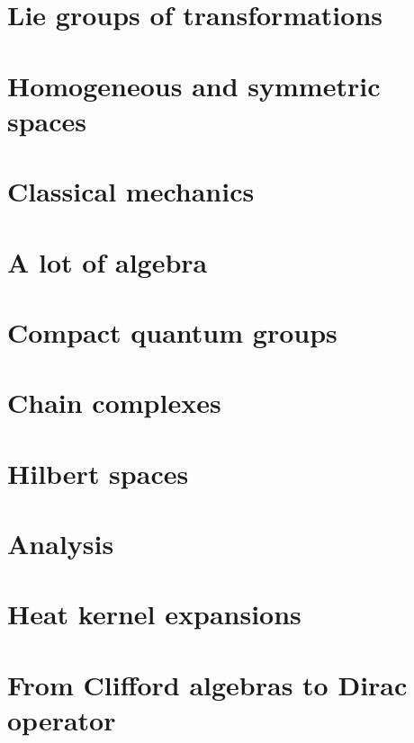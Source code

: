 \chapter{Lie groups of transformations}


\chapter{Homogeneous and symmetric spaces}


\chapter{Classical mechanics}



\chapter{A lot of algebra}



\chapter{Compact quantum groups}


\chapter{Chain complexes}


\chapter{Hilbert spaces}



\chapter{Analysis}








\chapter{Heat kernel expansions}


\chapter{From Clifford algebras to Dirac operator}



